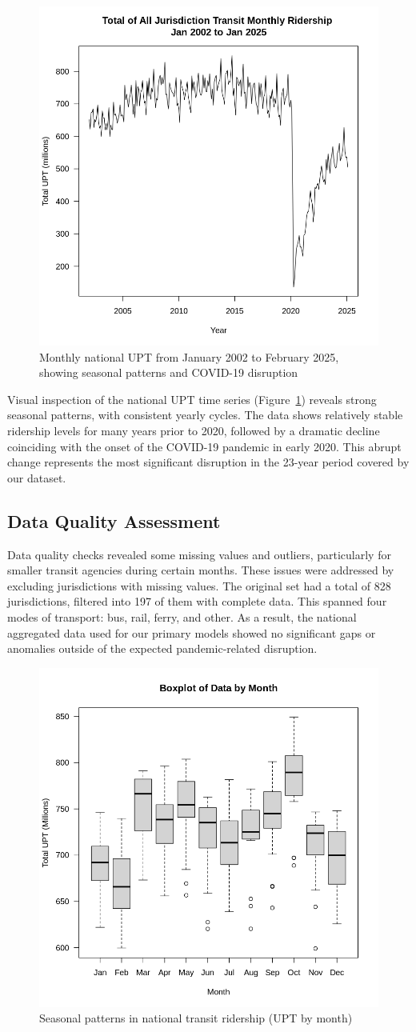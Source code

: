 \documentclass[11pt]{article}
\begin{document}
\begin{figure}[!ht]
\centering
\includegraphics[width=0.525\linewidth]{Total_UPT_trend.png}
\caption{Monthly national UPT from January 2002 to February 2025, showing seasonal patterns and COVID-19 disruption}
\label{f:data}
\end{figure}

Visual inspection of the national UPT time series (Figure~\ref{f:data}) reveals strong seasonal patterns, with consistent yearly cycles. The data shows relatively stable ridership levels for many years prior to 2020, followed by a dramatic decline coinciding with the onset of the COVID-19 pandemic in early 2020. This abrupt change represents the most significant disruption in the 23-year period covered by our dataset.

\subsection{Data Quality Assessment}

Data quality checks revealed some missing values and outliers, particularly for smaller transit agencies during certain months. These issues were addressed by excluding jurisdictions with missing values. The original set had a total of 828 jurisdictions, filtered into 197 of them with complete data. This spanned four modes of transport: bus, rail, ferry, and other. As a result, the national aggregated data used for our primary models showed no significant gaps or anomalies outside of the expected pandemic-related disruption.

\begin{figure}[!ht]
\centering
\includegraphics[width=0.525\linewidth]{seasonal_trend.png}
\caption{Seasonal patterns in national transit ridership (UPT by month)}
\label{f:seasonal}
\end{figure}
\end{document}
